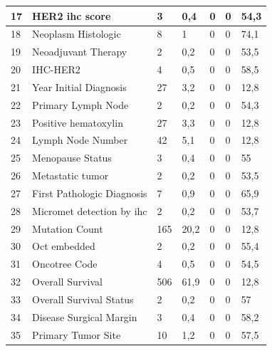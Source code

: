 \begin{table}[hbt!]
\begin{threeparttable}
\begin{tabular}{p{0.5cm} p{4cm} p{1.5cm} p{2cm} p{1.5cm} p{2cm} p{1.5cm}}
			\\ \hline	17	&	HER2 ihc score	&	3	&	0,4	&	0	&	0	&	54,3
			\\ \hline	18	&	Neoplasm Histologic	&	8	&	1	&	0	&	0	&	74,1
			\\ \hline	19	&	Neoadjuvant Therapy 	&	2	&	0,2	&	0	&	0	&	53,5
			\\ \hline	20	&	IHC-HER2	&	4	&	0,5	&	0	&	0	&	58,5
			\\ \hline	21	&	Year Initial Diagnosis	&	27	&	3,2	&	0	&	0	&	12,8
			\\ \hline	22	&	Primary Lymph Node  	&	2	&	0,2	&	0	&	0	&	54,3
			\\ \hline	23	&	Positive hematoxylin 	&	27	&	3,3	&	0	&	0	&	12,8
			\\ \hline	24	&	Lymph Node Number	&	42	&	5,1	&	0	&	0	&	12,8
			\\ \hline	25	&	Menopause Status	&	3	&	0,4	&	0	&	0	&	55
			\\ \hline	26	&	Metastatic tumor 	&	2	&	0,2	&	0	&	0	&	53,5
			\\ \hline	27	&	First Pathologic Diagnosis 	&	7	&	0,9	&	0	&	0	&	65,9
			\\ \hline	28	&	Micromet detection by ihc	&	2	&	0,2	&	0	&	0	&	53,7
			\\ \hline	29	&	Mutation Count	&	165	&	20,2	&	0	&	0	&	12,8
			\\ \hline	30	&	Oct embedded	&	2	&	0,2	&	0	&	0	&	55,4
			\\ \hline	31	&	Oncotree Code	&	4	&	0,5	&	0	&	0	&	54,5
			\\ \hline	32	&	Overall Survival 	&	506	&	61,9	&	0	&	0	&	12,8
			\\ \hline	33	&	Overall Survival Status	&	2	&	0,2	&	0	&	0	&	57
			\\ \hline	34	&	Disease Surgical Margin 	&	3	&	0,4	&	0	&	0	&	58,2
			\\ \hline	35	&	Primary Tumor Site	&	10	&	1,2	&	0	&	0	&	57,5
			\\ \hline
		\end{tabular}
	\end{threeparttable}
\end{table}


